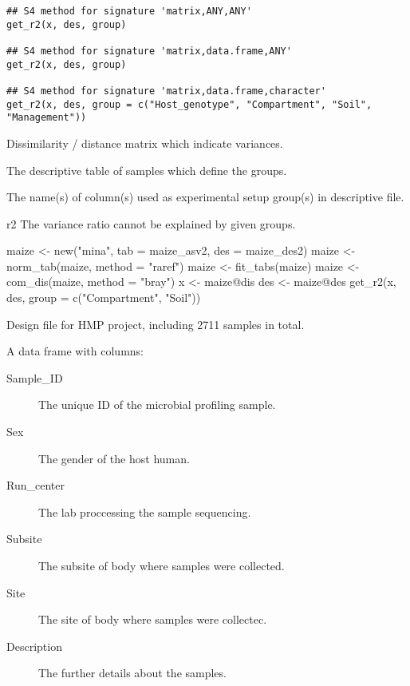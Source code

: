 \documentclass[a4paper]{book}
\begin{document}
%
\begin{Usage}
\begin{verbatim}
## S4 method for signature 'matrix,ANY,ANY'
get_r2(x, des, group)

## S4 method for signature 'matrix,data.frame,ANY'
get_r2(x, des, group)

## S4 method for signature 'matrix,data.frame,character'
get_r2(x, des, group = c("Host_genotype", "Compartment", "Soil", "Management"))
\end{verbatim}
\end{Usage}
%
\begin{Arguments}
\begin{ldescription}
\item[\code{x}] Dissimilarity / distance matrix which indicate variances.

\item[\code{des}] The descriptive table of samples which define the groups.

\item[\code{group}] The name(s) of column(s) used  as experimental setup group(s) in
descriptive file.
\end{ldescription}
\end{Arguments}
%
\begin{Value}
r2 The variance ratio cannot be explained by given groups.
\end{Value}
%
\begin{Examples}
\begin{ExampleCode}
maize <- new("mina", tab = maize_asv2, des = maize_des2)
maize <- norm_tab(maize, method = "raref")
maize <- fit_tabs(maize)
maize <- com_dis(maize, method = "bray")
x <- maize@dis
des <- maize@des
get_r2(x, des, group = c("Compartment", "Soil"))
\end{ExampleCode}
\end{Examples}
%
\begin{Description}\relax
Design file for HMP project, including 2711 samples in total.
\end{Description}
%
\begin{Format}
A data frame with columns:
\begin{description}

\item[Sample\_ID] The unique ID of the microbial profiling sample.
\item[Sex] The gender of the host human.
\item[Run\_center] The lab proccessing the sample sequencing.
\item[Subsite] The subsite of body where samples were collected.
\item[Site] The site of body where samples were collectec.
\item[Description] The further details about the samples.

\end{description}

\end{Format}
\end{document}

